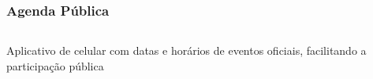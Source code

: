 \documentclass{beamer}
\begin{document}
\begin{frame}
  \frametitle{Agenda Pública}
  \begin{columns}
    \begin{column}{0.5\textwidth}
      Aplicativo de celular com datas e horários de eventos oficiais, facilitando a participação pública
    \end{column}
    \begin{column}{0.5\textwidth}
    \end{column}
  \end{columns}
\end{frame}
\end{document}
